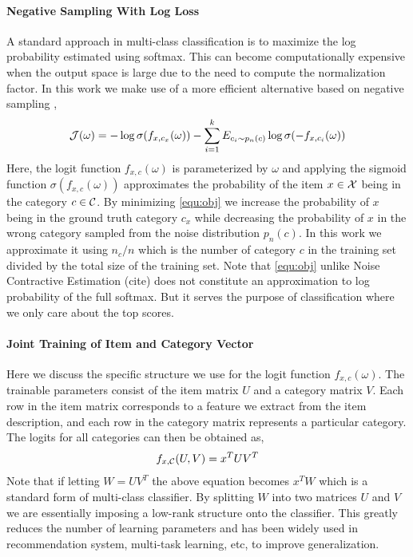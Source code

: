 \paragraph{Negative Sampling With Log Loss}
A standard approach in multi-class classification is to maximize the log probability estimated using softmax. This can become computationally expensive when the output space is large due to the need to compute the normalization factor. In this work we make use of a more efficient alternative based on negative sampling \cite{mikolov2013distributed},
\begin{align}
\label{equ:obj}
    \mathcal{J}(\omega) = 
    - \log \sigma(f_{x, c_x}(\omega)) 
    - \sum_{i=1}^k E_{c_i \sim p_n(c)} \log \sigma(-f_{x, c_i}(\omega))
\end{align}
Here, the logit function $f_{x, c}(\omega)$ is parameterized by $\omega$ and applying the sigmoid function $\sigma(f_{x, c}(\omega))$ approximates the probability of the item $x \in \mathcal{X}$ being in the category $c \in \mathcal{C}$. 
By minimizing \eqref{equ:obj} we increase the probability of $x$ being in the ground truth category $c_x$ while decreasing the probability of $x$ in the wrong category sampled from the noise distribution $p_n(c)$. In this work we approximate it using $n_c / n$ which is the number of category $c$ in the training set divided by the total size of the training set. Note that \eqref{equ:obj} unlike Noise Contractive Estimation (cite) does not constitute an approximation to log probability of the full softmax. 
But it serves the purpose of classification where we only care about the top scores.

\paragraph{Joint Training of Item and Category Vector}
Here we discuss the specific structure we use for the logit function $f_{x, c}(\omega)$. The trainable parameters consist of the item matrix $U$ and a category matrix $V$. Each row in the item matrix corresponds to a feature we extract from the item description, and each row in the category matrix represents a particular category. The logits for all categories can then be obtained as,
\begin{align*}
    f_{x, \mathcal{C}}(U, V) = x^TUV^T
\end{align*}
Note that if letting $W = UV^T$ the above equation becomes $x^TW$ which is a standard form of multi-class classifier. By splitting $W$ into two matrices $U$ and $V$ we are essentially imposing a low-rank structure onto the classifier. This greatly reduces the number of learning parameters and has been widely used in recommendation system, multi-task learning, etc, to improve generalization.

